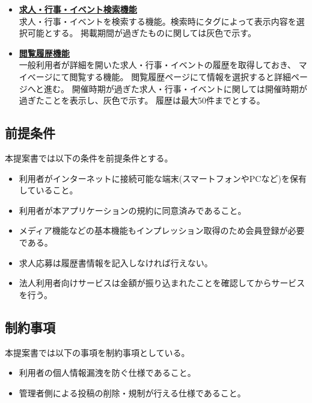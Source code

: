 \documentclass[a4paper,dvipdfmx]{jarticle}
\begin{document}
\begin{itemize}
\begin{itemize}
                  求人情報表示の場合は開催時期、時給 (日給)、労働時間、気になるリスト数、
                  レビュー評価によるタグ分け、さらに、求人であるかによるタグ分けも可能であり、
                  行事・イベント情報では開催時期、気になるリスト数、レビュー評価、
                  レビュー数によりタグ分けが可能とする。このタグ分け機能は検索時と閲覧履歴にも有効とする。
                  また、指定したタグの内容を非表示にすることも可能とする。
              \item[-] \underline{\textbf{求人・行事・イベント検索機能}}\\
                  求人・行事・イベントを検索する機能。検索時にタグによって表示内容を選択可能とする。
                  掲載期間が過ぎたものに関しては灰色で示す。
              \item[-] \underline{\textbf{閲覧履歴機能}}\\
                  一般利用者が詳細を開いた求人・行事・イベントの履歴を取得しておき、
                  マイべージにて閲覧する機能。
                  閲覧履歴ページにて情報を選択すると詳細ページへと進む。
                  開催時期が過ぎた求人・行事・イベントに関しては開催時期が過ぎたことを表示し、灰色で示す。
                  履歴は最大50件までとする。
          \end{itemize}
\end{itemize}
\subsection{前提条件}
本提案書では以下の条件を前提条件とする。
\begin{itemize}
    \item 利用者がインターネットに接続可能な端末(スマートフォンやPCなど)を保有していること。
    \item 利用者が本アプリケーションの規約に同意済みであること。
    \item メディア機能などの基本機能もインプレッション取得のため会員登録が必要である。
    \item 求人応募は履歴書情報を記入しなければ行えない。
    \item 法人利用者向けサービスは金額が振り込まれたことを確認してからサービスを行う。
\end{itemize}
\subsection{制約事項}
本提案書では以下の事項を制約事項としている。
\begin{itemize}
    \item 利用者の個人情報漏洩を防ぐ仕様であること。
    \item 管理者側による投稿の削除・規制が行える仕様であること。
\end{itemize}
\end{document}
